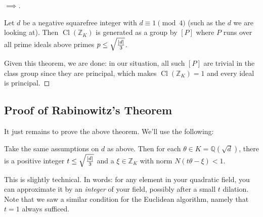 \begin{proof}[$\implies$]
\begin{theorem}

Let \(d\) be a negative squarefree integer with \(d \equiv 1 \pmod 4\)
(such as the \(d\) we are looking at). Then
\(\operatorname{Cl}({\mathbb{Z}}_K)\) is generated as a group by \([P]\)
where \(P\) runs over all prime ideals above primes
\(p \leq \sqrt{{\left\lvert {d} \right\rvert}\over 3 }\).

\end{theorem}

Given this theorem, we are done: in our situation, all such \([P]\) are
trivial in the class group since they are principal, which makes
\(\operatorname{Cl}({\mathbb{Z}}_K) = 1\) and every ideal is principal.

\end{proof}

\hypertarget{proof-of-rabinowitzs-theorem}{%
\subsection{Proof of Rabinowitz's
Theorem}\label{proof-of-rabinowitzs-theorem}}

\begin{remark}

It just remains to prove the above theorem. We'll use the following:

\end{remark}

\begin{proposition}

Take the same assumptions on \(d\) as above. Then for each
\(\theta \in K = {\mathbb{Q}}( \sqrt{d} )\), there is a positive integer
\(t \leq \sqrt{{\left\lvert {d} \right\rvert}\over 3 }\) and a
\(\xi \in {\mathbb{Z}}_K\) with norm \(N(t\theta - \xi) < 1\).

\end{proposition}

\begin{remark}

This is slightly technical. In words: for any element in your quadratic
field, you can approximate it by an \emph{integer} of your field,
possibly after a small \(t\) dilation. Note that we saw a similar
condition for the Euclidean algorithm, namely that \(t=1\) always
sufficed.

\end{remark}


